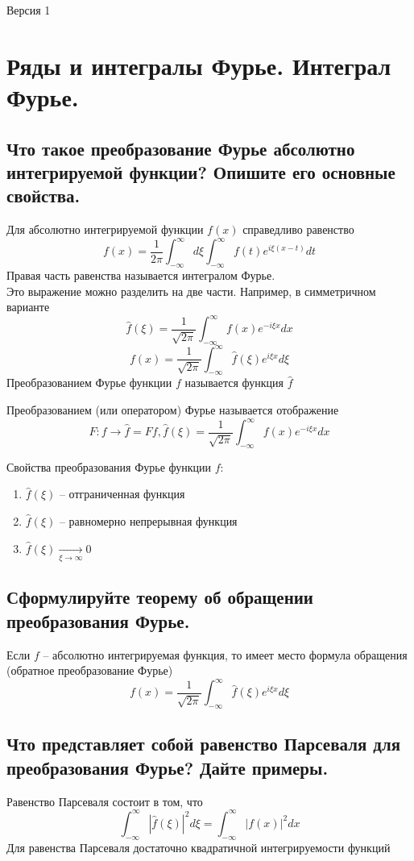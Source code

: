 \documentclass{article}
\begin{document}
\begin{flushright}
	Версия 1
\end{flushright}
\section{Ряды и интегралы Фурье. Интеграл Фурье.}

\subsection{Что такое преобразование Фурье абсолютно интегрируемой функции? Опишите его основные свойства.}

Для абсолютно интегрируемой функции $f(x)$ справедливо равенство
\[ f(x)=\frac{1}{2\pi}\int_{-\infty}^{\infty}{ d\xi \int_{-\infty}^{\infty} f(t)e^{i\xi(x-t)}dt}\]
Правая часть равенства называется интегралом Фурье.\\
Это выражение можно разделить на две части. Например, в симметричном варианте
\[ \widehat{f}(\xi) = \frac{1}{\sqrt{2\pi}}\int_{-\infty}^{\infty}f(x)e^{-i\xi x}dx  \]
\[ f(x) = \frac{1}{\sqrt{2\pi}}\int_{-\infty}^{\infty}\widehat{f}(\xi)e^{i\xi x}d\xi  \]
Преобразованием Фурье функции $f$ называется функция $\widehat{f}$

Преобразованием (или оператором) Фурье называется отображение
\[ F: f \rightarrow \widehat{f}=Ff, \widehat{f}(\xi) = \frac{1}{\sqrt{2\pi}}\int_{-\infty}^{\infty}f(x)e^{-i\xi x}dx\]

Свойства преобразования Фурье функции $f$:
\begin{enumerate}
	\item $ \widehat{f}(\xi) $ -- отграниченная функция
	\item $ \widehat{f}(\xi) $ -- равномерно непрерывная функция
	\item $ \widehat{f}(\xi) \underset{\xi\rightarrow \infty}\longrightarrow 0$
\end{enumerate}

\subsection{Сформулируйте теорему об обращении преобразования Фурье.}
Если $ f $ -- абсолютно интегрируемая функция, то имеет место формула обращения (обратное преобразование Фурье)
\[ f(x) = \frac{1}{\sqrt{2\pi}}\int_{-\infty}^{\infty}\widehat{f}(\xi)e^{i\xi x}d\xi  \]

\subsection{Что представляет собой равенство Парсеваля для преобразования Фурье? Дайте примеры.}
Равенство Парсеваля состоит в том, что 
\[ \int_{-\infty}^{\infty} \left| \widehat{f}(\xi) \right| ^2 d\xi =  \int_{-\infty}^{\infty} \left| f(x) \right| ^2 dx \]
Для равенства Парсеваля достаточно квадратичной интегрируемости функций
\end{document}
